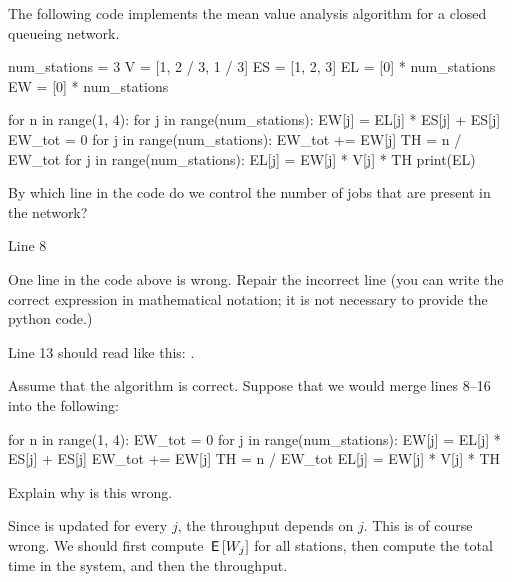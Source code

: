 The following code implements the mean value analysis algorithm for a closed queueing network.

\begin{pyverbatim}[stdout][numbers=left]
num_stations = 3
V = [1, 2 / 3, 1 / 3]
ES = [1, 2, 3]
EL = [0] * num_stations
EW = [0] * num_stations


for n in range(1, 4):
    for j in range(num_stations):
        EW[j] = EL[j] * ES[j] + ES[j]
    EW_tot = 0
    for j in range(num_stations):
        EW_tot += EW[j]
    TH = n / EW_tot
    for j in range(num_stations):
        EL[j] =  EW[j] *  V[j] * TH
    print(EL)

  \end{pyverbatim}  

\begin{exercise}[201904, 1]
  By which line in the code do we control the number of jobs that are present in the network?
\begin{solution}
    Line 8
\end{solution}
\end{exercise}

\begin{exercise}[201904, 1]
  One line in the code above is wrong.
  Repair the incorrect line (you can write the correct expression in mathematical notation; it is not necessary to provide the python code.)
\begin{solution}
Line 13 should read like this: .
\end{solution}
\end{exercise}

\begin{exercise}[201904, 1]
  Assume that the algorithm is correct.
  Suppose that we would merge lines 8--16 into the following:
\begin{pyverbatim}[stdout][numbers=left]
for n in range(1, 4):
    EW_tot = 0
    for j in range(num_stations):
        EW[j] = EL[j] * ES[j] + ES[j]
        EW_tot += EW[j]
        TH = n / EW_tot
        EL[j] =  EW[j] *  V[j] * TH
      \end{pyverbatim}
      Explain why is this wrong.
\begin{solution}
Since  is updated for every $j$, the throughput depends on $j$. This is of course wrong. We should first compute  $\,\mathsf{E}\left[W_j\right]$ for all stations, then compute the total time in the system, and then the throughput. 
\end{solution}
\end{exercise}  

